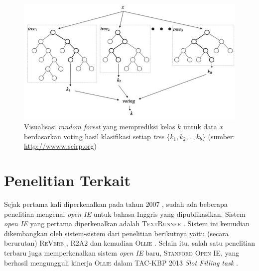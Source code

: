 \begin{figure}
\centering
\includegraphics[scale=0.5]{../images/random-forest.png}
\caption{Visualisasi \textit{random forest} yang memprediksi kelas $k$ untuk data $x$ berdasarkan voting hasil klasifikasi setiap \textit{tree} $\{k_1, k_2, .., k_b\}$ (sumber: \url{http://wwww.scirp.org})}
\label{fig:random-forest}
\end{figure}


\section{Penelitian Terkait}

Sejak pertama kali diperkenalkan pada tahun 2007 \citep{banko2007open}, sudah ada beberapa penelitian mengenai \textit{open IE} untuk bahasa Inggris yang dipublikasikan. Sistem \textit{open IE} yang pertama diperkenalkan adalah \textsc{TextRunner} \citep{banko2007open}. Sistem ini kemudian dikembangkan oleh sistem-sistem dari penelitian berikutnya yaitu (secara berurutan) \textsc{ReVerb} \citep{fader2011identifying}, \textsc{R2A2} \citep{etzioni2011open} dan kemudian \textsc{Ollie} \citep{schmitz2012open}	. Selain itu, salah satu penelitian terbaru juga memperkenalkan sistem \textit{open IE} baru, \textsc{Stanford Open IE}, yang berhasil mengungguli kinerja \textsc{Ollie} dalam TAC-KBP 2013 \textit{Slot Filling task} \citep{angeli2015leveraging}.


